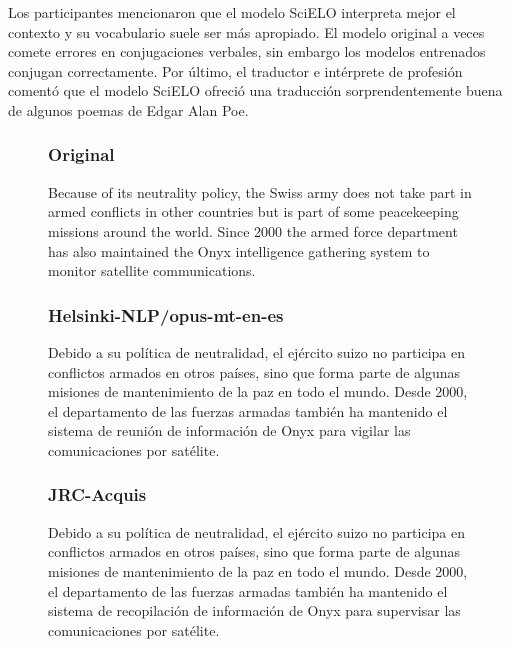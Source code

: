 Los participantes mencionaron que el modelo SciELO interpreta mejor el contexto y su vocabulario suele ser más apropiado. El modelo original a veces comete errores en conjugaciones verbales, sin embargo los modelos entrenados conjugan correctamente. Por último, el traductor e intérprete de profesión comentó que el modelo SciELO ofreció una traducción sorprendentemente buena de algunos poemas de Edgar Alan Poe.

\begin{figure}[H]
\subsubsection{Original}
\begin{spverbatim}
Because of its neutrality policy, the Swiss army does not take part in armed conflicts in other countries but is part of some peacekeeping missions around the world. Since 2000 the armed force department has also maintained the Onyx intelligence gathering system to monitor satellite communications.
\end{spverbatim}

\subsubsection{Helsinki-NLP/opus-mt-en-es}
\begin{spverbatim}
Debido a su política de neutralidad, el ejército suizo no participa en conflictos armados en otros países, sino que forma parte de algunas misiones de mantenimiento de la paz en todo el mundo. Desde 2000, el departamento de las fuerzas armadas también ha mantenido el sistema de reunión de información de Onyx para vigilar las comunicaciones por satélite.
\end{spverbatim}

\subsubsection{JRC-Acquis}
\begin{spverbatim}
Debido a su política de neutralidad, el ejército suizo no participa en conflictos armados en otros países, sino que forma parte de algunas misiones de mantenimiento de la paz en todo el mundo. Desde 2000, el departamento de las fuerzas armadas también ha mantenido el sistema de recopilación de información de Onyx para supervisar las comunicaciones por satélite.
\end{spverbatim}


\end{figure}

